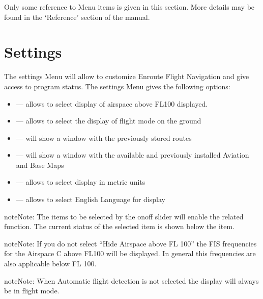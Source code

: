 \documentclass[letterpaper,10pt,english]{sphinxmanual}
\begin{document}
Only some reference to Menu items is given in this section. More details may be found in the ‘Reference’ section of  the manual.


\section{Settings}
\label{\detokenize{01-intro/further_steps:settings}}
The settings Menu will allow to customize Enroute Flight Navigation and give access to program status.
The settings Menu gives the following options:
\begin{itemize}
\item {} 
 — allows to select display of airspace above FL100 displayed.

\item {} 
 — allows to select the display of flight mode on the ground

\item {} 
 — will show a window with the previously stored routes

\item {} 
 — will show a window with the available and previously installed Aviation and Base Maps

\item {} 
 — allows to select display in metric units

\item {} 
 — allows to select English Language for display

\end{itemize}

\begin{sphinxadmonition}{note}{Note:}
The items to be selected by the on\sphinxhyphen{}off slider will enable the related function. The current status of the selected item is shown below the item.
\end{sphinxadmonition}

\begin{sphinxadmonition}{note}{Note:}
If you do not select “Hide Airspace above FL 100” the FIS frequencies for the Airspace C above FL100 will be displayed. In general this frequencies are also applicable below FL 100.
\end{sphinxadmonition}

\begin{sphinxadmonition}{note}{Note:}
When Automatic flight detection is not selected the display will always be in flight mode.
\end{sphinxadmonition}
\end{document}
